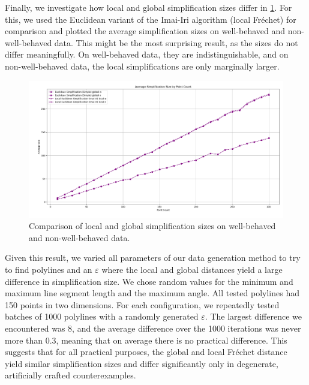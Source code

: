 Finally, we investigate how local and global simplification sizes differ in \cref{fig:res-local-global}. For this, we used the Euclidean variant of the Imai-Iri algorithm (local Fréchet) for comparison and plotted the average simplification sizes on well-behaved and non-well-behaved data. This might be the most surprising result, as the sizes do not differ meaningfully. On well-behaved data, they are indistinguishable, and on non-well-behaved data, the local simplifications are only marginally larger.

\begin{figure}[b]
  \centering
	\includegraphics[scale=0.4]{./figures/res_local_global.png}
  \caption{Comparison of local and global simplification sizes on well-behaved and non-well-behaved data.}
  \label{fig:res-local-global}
\end{figure}

Given this result, we varied all parameters of our data generation method to try to find polylines and an \(\varepsilon\) where the local and global distances yield a large difference in simplification size. We chose random values for the minimum and maximum line segment length and the maximum angle. All tested polylines had 150 points in two dimensions. For each configuration, we repeatedly tested batches of 1000 polylines with a randomly generated \(\varepsilon\). The largest difference we encountered was 8, and the average difference over the 1000 iterations was never more than 0.3, meaning that on average there is no practical difference. This suggests that for all practical purposes, the global and local Fréchet distance yield similar simplification sizes and differ significantly only in degenerate, artificially crafted counterexamples.
